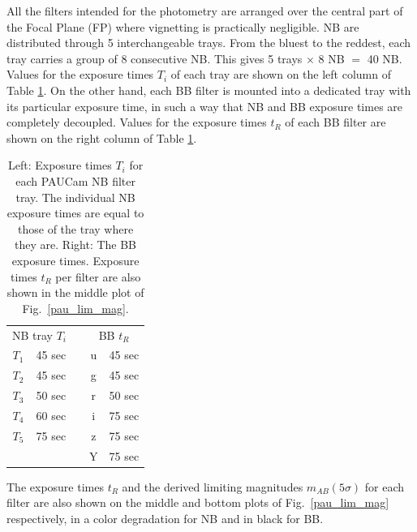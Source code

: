 All the filters intended for the photometry are arranged over the central part of the Focal Plane (FP) where vignetting is practically negligible. NB are distributed through 5 interchangeable trays. From the bluest to the reddest, each tray carries a group of 8 consecutive NB. This gives 5 trays $\times$ 8 NB $=$ 40 NB. 
Values for the exposure times $T_i$ of each tray are shown on the left column of Table \ref{PAU_Texp}. On the other hand, each BB filter is mounted into a dedicated tray with its particular exposure time, in such a way that NB and BB exposure times are completely decoupled. Values for the exposure times $t_R$ of each BB filter are shown on the right column of Table \ref{PAU_Texp}.
\begin{table}
\caption{Left: Exposure times $T_i$ for each PAUCam NB filter tray. The individual NB exposure times are equal to those of the tray where they are. Right: The BB exposure times. Exposure times $t_R$ per filter are also shown in the middle plot of Fig.~\ref{pau_lim_mag}.}
\vspace*{12pt}
\centering
\begin{tabular}{ccccc}
\multicolumn{2}{c}{NB tray $T_i$} & & \multicolumn{2}{c}{BB $t_R$} \\
\cline{1-2} \cline{4-5} 
$T_1$  & 45 sec & & u & 45 sec \\
$T_2$  & 45 sec & & g & 45 sec \\
$T_3$  & 50 sec & & r & 50 sec \\
$T_4$  & 60 sec & & i & 75 sec \\
$T_5$  & 75 sec & & z & 75 sec \\
       &        & & Y & 75 sec \\
\cline{1-2} \cline{4-5} 
\end{tabular}
\label{PAU_Texp}
\end{table}
The exposure times $t_R$ and the derived limiting magnitudes $m_{AB}(5\sigma)$ for each filter are also shown on the middle and bottom plots of Fig.~\ref{pau_lim_mag} respectively, in a color degradation for NB and in black for BB. 
